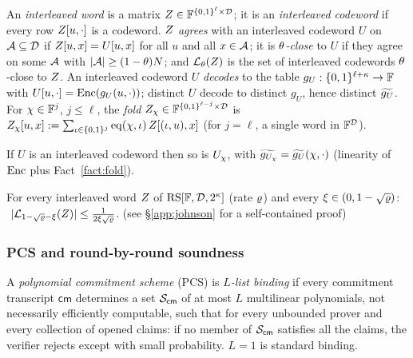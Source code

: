 \begin{definition}\label{def:interleaved}
An \emph{interleaved word} is a matrix $Z \in \mathbb{F}^{\{0,1\}^{\ell} \times \mathcal{D}}$; it is an \emph{interleaved codeword} if every row $Z[u, \cdot]$ is a codeword. $Z$ \emph{agrees} with an interleaved codeword $U$ on $\mathcal{A} \subseteq \mathcal{D}$ if $Z[u,x] = U[u,x]$ for all $u$ and all $x \in \mathcal{A}$; it is \emph{$\theta$-close} to $U$ if they agree on some $\mathcal{A}$ with $|\mathcal{A}| \ge (1-\theta)N$; and $\mathcal{L}_\theta(Z)$ is the set of interleaved codewords $\theta$-close to $Z$. An interleaved codeword $U$ \emph{decodes} to the table $g_U : \{0,1\}^{\ell + \kappa} \to \mathbb{F}$ with $U[u, \cdot] = \mathrm{Enc}(g_U(u, \cdot))$; distinct $U$ decode to distinct $g_U$, hence distinct $\widetilde{g_U}$. For $\chi \in \mathbb{F}^{j}$, $j \le \ell$, the \emph{fold} $Z_\chi \in \mathbb{F}^{\{0,1\}^{\ell - j} \times \mathcal{D}}$ is $Z_\chi[u, x] := \sum_{\iota \in \{0,1\}^{j}} \operatorname{eq}(\chi, \iota)\, Z[(\iota, u), x]$ (for $j = \ell$, a single word in $\mathbb{F}^{\mathcal{D}}$).
\end{definition}

\begin{fact}\label{fact:fold-decode}
If $U$ is an interleaved codeword then so is $U_\chi$, with $\widetilde{g_{U_\chi}} = \widetilde{g_U}(\chi, \cdot)$ (linearity of $\mathrm{Enc}$ plus Fact~\ref{fact:fold}).
\end{fact}

\begin{theorem}\label{thm:johnson-interleaved}
For every interleaved word $Z$ of $\mathrm{RS}[\mathbb{F},\mathcal{D},2^\kappa]$ (rate $\varrho$) and every $\xi \in (0, 1-\sqrt{\varrho})$: $\ |\mathcal{L}_{1-\sqrt{\varrho}-\xi}(Z)| \le \frac{1}{2\xi\sqrt{\varrho}}$. (see \S\ref{app:johnson} for a self-contained proof)
\end{theorem}

\subsubsection{PCS and round-by-round soundness}\label{sec:iopcs}

\begin{definition}\label{def:listbinding}
A \emph{polynomial commitment scheme} (PCS) is \emph{$L$-list binding} if every commitment transcript $\mathsf{cm}$ determines a set $\mathcal{S}_{\mathsf{cm}}$ of at most $L$ multilinear polynomials, not necessarily efficiently computable, such that for every unbounded prover and every collection of opened claims: if no member of $\mathcal{S}_{\mathsf{cm}}$ satisfies all the claims, the verifier rejects except with small probability. $L = 1$ is standard binding.
\end{definition}

